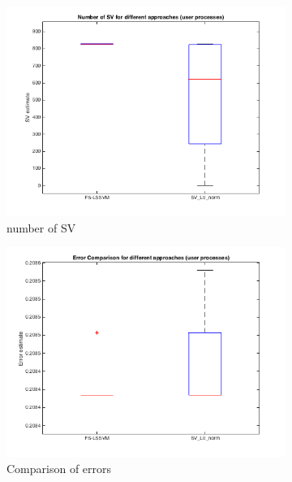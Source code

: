\documentclass[11pt,oneside,a4paper]{article}
\begin{document}
\begin{figure}[H]
	\begin{subfigure}[b]{0.4\textwidth}
		\includegraphics[width=\textwidth]{../Figures/sv_num}
		\caption{number of SV}
	\end{subfigure}
	\begin{subfigure}[b]{0.4\textwidth}
		\includegraphics[width=\textwidth]{../Figures/error}
		\caption{Comparison of errors}
	\end{subfigure}
	\begin{subfigure}[b]{0.4\textwidth}

\end{subfigure}
\end{figure}
\end{document}
